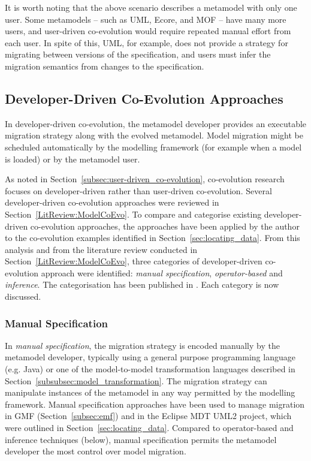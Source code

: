 It is worth noting that the above scenario describes a metamodel with only one user. Some metamodels -- such as UML, Ecore, and MOF -- have many more users, and user-driven co-evolution would require repeated manual effort from each user. In spite of this, UML, for example, does not provide a strategy for migrating between versions of the specification, and users must infer the migration semantics from changes to the specification.

\subsection{Developer-Driven Co-Evolution Approaches}
\label{subsec:co-evolution_categorisation}
In developer-driven co-evolution, the metamodel developer provides an executable migration strategy along with the evolved metamodel. Model migration might be scheduled automatically by the modelling framework (for example when a model is loaded) or by the metamodel user.

As noted in Section~\ref{subsec:user-driven_co-evolution}, co-evolution research focuses on developer-driven rather than user-driven co-evolution. Several developer-driven co-evolution approaches were reviewed in Section~\ref{LitReview:ModelCoEvo}. To compare and categorise existing developer-driven co-evolution approaches, the approaches have been applied by the author to the co-evolution examples identified in Section~\ref{sec:locating_data}. From this analysis and from the literature review conducted in Section~\ref{LitReview:ModelCoEvo}, three categories of developer-driven co-evolution approach were identified: \emph{manual specification}, \emph{operator-based} and \emph{inference}. The categorisation has been published in \cite{rose09analysis}. Each category is now discussed.

\subsubsection{Manual Specification}
In \emph{manual specification}, the migration strategy is encoded manually by the metamodel developer, typically using a general purpose programming language (e.g. Java) or one of the model-to-model transformation languages described in Section~\ref{subsubsec:model_transformation}. The migration strategy can manipulate instances of the metamodel in any way permitted by the modelling framework. Manual specification approaches have been used to manage migration in GMF (Section~\ref{subsec:emf}) and in the Eclipse MDT UML2 project, which were outlined in Section~\ref{sec:locating_data}. Compared to operator-based and inference techniques (below), manual specification permits the metamodel developer the most control over model migration.

